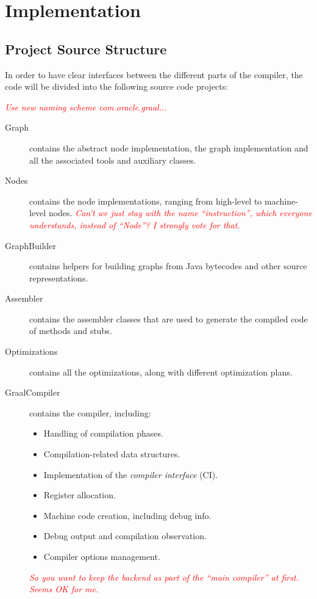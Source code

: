 \documentclass[twocolumn]{svjour3}
\newcommand{\mynote}[2]{
\textcolor{red}{\fbox{\bfseries\sffamily\scriptsize#1}
  {\small\textsf{\emph{#2}}}
\fbox{\bfseries\sffamily\scriptsize }}}
\newcommand\cw[1]{\mynote{CW}{#1}}
\begin{document}
\section{Implementation}


\subsection{Project Source Structure}
In order to have clear interfaces between the different parts of the compiler, the code will be divided into the following source code projects:
\cw{Use new naming scheme com.oracle.graal...}
\begin{description}
    \item[Graph] contains the abstract node implementation, the graph implementation and all the associated tools and auxiliary classes.
    \item[Nodes] contains the node implementations, ranging from high-level to machine-level nodes. \cw{Can't we just stay with the name ``instruction'', which everyone understands, instead of ``Node''?  I strongly vote for that.}
    \item[GraphBuilder] contains helpers for building graphs from Java bytecodes and other source representations.
    \item[Assembler] contains the assembler classes that are used to generate the compiled code of methods and stubs.
    \item[Optimizations] contains all the optimizations, along with different optimization plans.
    \item[GraalCompiler] contains the compiler, including:
        \begin{itemize}
            \item Handling of compilation phases.
            \item Compilation-related data structures.
            \item Implementation of the \emph{compiler interface} (CI).
            \item Register allocation.
            \item Machine code creation, including debug info.
            \item Debug output and compilation observation.
            \item Compiler options management.
        \end{itemize}
		\cw{So you want to keep the backend as part of the ``main compiler'' at first.  Seems OK for me.}
\end{description}
\end{document}
